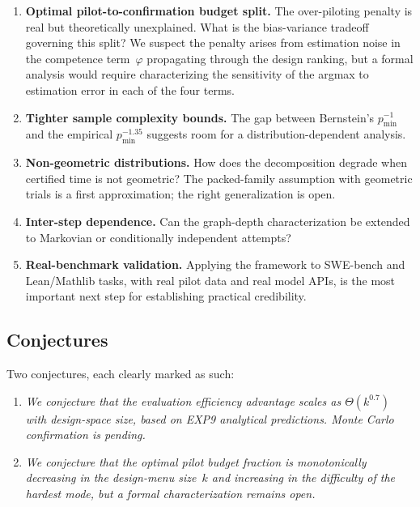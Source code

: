 \documentclass[twoside,11pt]{article}
\newcommand{\pmin}{p_{\min}}
\begin{document}
\begin{enumerate}
\item \textbf{Optimal pilot-to-confirmation budget split.}
The over-piloting penalty is real but theoretically unexplained.
What is the bias-variance tradeoff governing this split?
We suspect the penalty arises from estimation noise in the competence term~$\varphi$ propagating through the design ranking, but a formal analysis would require characterizing the sensitivity of the argmax to estimation error in each of the four terms.

\item \textbf{Tighter sample complexity bounds.}
The gap between Bernstein's $\pmin^{-1}$ and the empirical $\pmin^{-1.35}$ suggests room for a distribution-dependent analysis.

\item \textbf{Non-geometric distributions.}
How does the decomposition degrade when certified time is not geometric?
The packed-family assumption with geometric trials is a first approximation; the right generalization is open.

\item \textbf{Inter-step dependence.}
Can the graph-depth characterization be extended to Markovian or conditionally independent attempts?

\item \textbf{Real-benchmark validation.}
Applying the framework to SWE-bench and Lean/Mathlib tasks, with real pilot data and real model APIs, is the most important next step for establishing practical credibility.
\end{enumerate}

\subsection{Conjectures}

Two conjectures, each clearly marked as such:

\begin{enumerate}
\item \emph{We conjecture that the evaluation efficiency advantage scales as $\Theta(k^{0.7})$ with design-space size, based on EXP9 analytical predictions.
Monte Carlo confirmation is pending.}

\item \emph{We conjecture that the optimal pilot budget fraction is monotonically decreasing in the design-menu size~$k$ and increasing in the difficulty of the hardest mode, but a formal characterization remains open.}
\end{enumerate}
\end{document}
